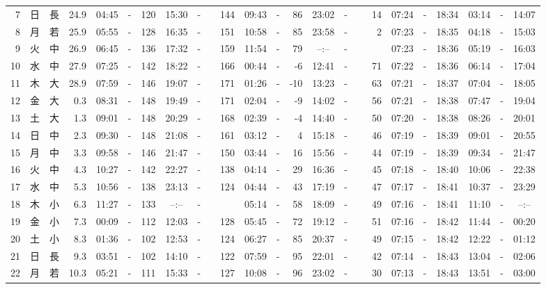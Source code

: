 \documentclass[12pt,a4j]{jsarticle}
\begin{document}
\begin{table}[htbp]
\begin{center}
{\begin{tabular}{|rc|cr|ccrccr|ccrccr|ccc|ccc|}
 7 & 日 & 長 & 24.9 &  04:45 &-& 120 &  15:30 &-& 144 &  09:43 &-&  86 &  23:02 &-&  14 & 07:24 & -& 18:34 & 03:14 & -& 14:07 \\
 8 & 月 & 若 & 25.9 &  05:55 &-& 128 &  16:35 &-& 151 &  10:58 &-&  85 &  23:58 &-&   2 & 07:23 & -& 18:35 & 04:18 & -& 15:03 \\
 9 & 火 & 中 & 26.9 &  06:45 &-& 136 &  17:32 &-& 159 &  11:54 &-&  79 &  --:-- &-&~~~~~ & 07:23 & -& 18:36 & 05:19 & -& 16:03 \\
10 & 水 & 中 & 27.9 &  07:25 &-& 142 &  18:22 &-& 166 &  00:44 &-&  -6 &  12:41 &-&  71 & 07:22 & -& 18:36 & 06:14 & -& 17:04 \\
11 & 木 & 大 & 28.9 &  07:59 &-& 146 &  19:07 &-& 171 &  01:26 &-& -10 &  13:23 &-&  63 & 07:21 & -& 18:37 & 07:04 & -& 18:05 \\
12 & 金 & 大 &  0.3 &  08:31 &-& 148 &  19:49 &-& 171 &  02:04 &-&  -9 &  14:02 &-&  56 & 07:21 & -& 18:38 & 07:47 & -& 19:04 \\
13 & 土 & 大 &  1.3 &  09:01 &-& 148 &  20:29 &-& 168 &  02:39 &-&  -4 &  14:40 &-&  50 & 07:20 & -& 18:38 & 08:26 & -& 20:01 \\
14 & 日 & 中 &  2.3 &  09:30 &-& 148 &  21:08 &-& 161 &  03:12 &-&   4 &  15:18 &-&  46 & 07:19 & -& 18:39 & 09:01 & -& 20:55 \\
15 & 月 & 中 &  3.3 &  09:58 &-& 146 &  21:47 &-& 150 &  03:44 &-&  16 &  15:56 &-&  44 & 07:19 & -& 18:39 & 09:34 & -& 21:47 \\
16 & 火 & 中 &  4.3 &  10:27 &-& 142 &  22:27 &-& 138 &  04:14 &-&  29 &  16:36 &-&  45 & 07:18 & -& 18:40 & 10:06 & -& 22:38 \\
17 & 水 & 中 &  5.3 &  10:56 &-& 138 &  23:13 &-& 124 &  04:44 &-&  43 &  17:19 &-&  47 & 07:17 & -& 18:41 & 10:37 & -& 23:29 \\
18 & 木 & 小 &  6.3 &  11:27 &-& 133 &  --:-- &-&~~~~~ &  05:14 &-&  58 &  18:09 &-&  49 & 07:16 & -& 18:41 & 11:10 & -& --:-- \\
19 & 金 & 小 &  7.3 &  00:09 &-& 112 &  12:03 &-& 128 &  05:45 &-&  72 &  19:12 &-&  51 & 07:16 & -& 18:42 & 11:44 & -& 00:20 \\
20 & 土 & 小 &  8.3 &  01:36 &-& 102 &  12:53 &-& 124 &  06:27 &-&  85 &  20:37 &-&  49 & 07:15 & -& 18:42 & 12:22 & -& 01:12 \\
21 & 日 & 長 &  9.3 &  03:51 &-& 102 &  14:10 &-& 122 &  07:59 &-&  95 &  22:01 &-&  42 & 07:14 & -& 18:43 & 13:04 & -& 02:06 \\
22 & 月 & 若 & 10.3 &  05:21 &-& 111 &  15:33 &-& 127 &  10:08 &-&  96 &  23:02 &-&  30 & 07:13 & -& 18:43 & 13:51 & -& 03:00 \\

\end{tabular}}
\end{center}
\end{table}
\end{document}
